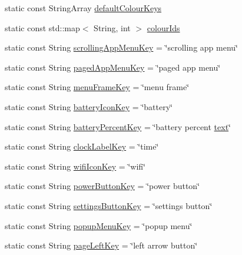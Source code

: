 \begin{DoxyCompactItemize}
\item 
static const String\+Array \mbox{\hyperlink{classComponentConfigFile_af218812d58a0af67b7632490803c4a69}{default\+Colour\+Keys}}
\item 
static const std\+::map$<$ String, int $>$ \mbox{\hyperlink{classComponentConfigFile_a5bf8be78dd943ff78d1b9fce70a1b994}{colour\+Ids}}
\item 
static const String \mbox{\hyperlink{classComponentConfigFile_a61966be0b36f2ef9c620bbf61ef87686}{scrolling\+App\+Menu\+Key}} = \char`\"{}scrolling app menu\char`\"{}
\item 
static const String \mbox{\hyperlink{classComponentConfigFile_a8d06be7c70ea29e823f57c4fa061adb6}{paged\+App\+Menu\+Key}} = \char`\"{}paged app menu\char`\"{}
\item 
static const String \mbox{\hyperlink{classComponentConfigFile_ac2ee472ddefecc76de9cb5853371fb82}{menu\+Frame\+Key}} = \char`\"{}menu frame\char`\"{}
\item 
static const String \mbox{\hyperlink{classComponentConfigFile_a613804a43d6243563a55a22dd161db43}{battery\+Icon\+Key}} = \char`\"{}battery\char`\"{}
\item 
static const String \mbox{\hyperlink{classComponentConfigFile_a20146b9d5193bc8f368c739b48bf5a5e}{battery\+Percent\+Key}} = \char`\"{}battery percent \mbox{\hyperlink{classComponentConfigFile_a9bf86058d7f64d6ba94770c3dbf3cad8ac27156a5310c2ff67c46cd3cd629eb70}{text}}\char`\"{}
\item 
static const String \mbox{\hyperlink{classComponentConfigFile_a2a887447ef1562c45715a66c9578c2c9}{clock\+Label\+Key}} = \char`\"{}time\char`\"{}
\item 
static const String \mbox{\hyperlink{classComponentConfigFile_a5c10f5b11465272acaff46b8e10e225e}{wifi\+Icon\+Key}} = \char`\"{}wifi\char`\"{}
\item 
static const String \mbox{\hyperlink{classComponentConfigFile_adf7ae9f1c9a87122a29084cac57c7471}{power\+Button\+Key}} = \char`\"{}power button\char`\"{}
\item 
static const String \mbox{\hyperlink{classComponentConfigFile_acf8c6fa3b10f88cfb59346677c432ceb}{settings\+Button\+Key}} = \char`\"{}settings button\char`\"{}
\item 
static const String \mbox{\hyperlink{classComponentConfigFile_a576e0a902d5dee82b6de22b784a7fcfd}{popup\+Menu\+Key}} = \char`\"{}popup menu\char`\"{}
\item 
static const String \mbox{\hyperlink{classComponentConfigFile_adeea9bba1d2894ed94d65f454544eed9}{page\+Left\+Key}} = \char`\"{}left arrow button\char`\"{}

\end{DoxyCompactItemize}
